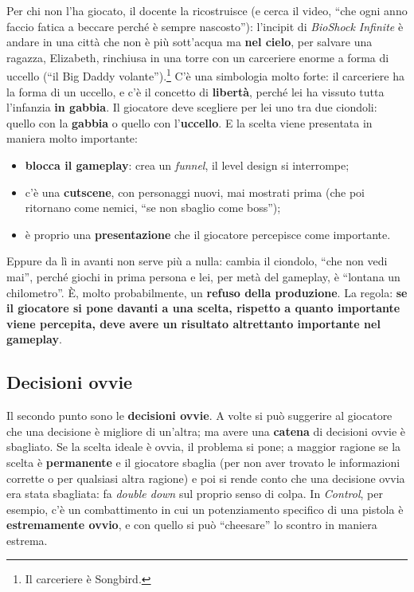 Per chi non l'ha giocato, il docente la ricostruisce (e cerca il video, ``che
ogni anno faccio fatica a beccare perché è sempre nascosto''): l'incipit di
\emph{BioShock Infinite} è andare in una città che non è più sott'acqua ma
\textbf{nel cielo}, per salvare una ragazza, Elizabeth, rinchiusa in una
torre con un carceriere enorme a forma di uccello (``il Big Daddy
volante'').\footnote{Il carceriere è Songbird.} C'è una simbologia molto
forte: il carceriere ha la forma di un uccello, e c'è il concetto di
\textbf{libertà}, perché lei ha vissuto tutta l'infanzia \textbf{in gabbia}.
Il giocatore deve scegliere per lei uno tra due ciondoli: quello con la
\textbf{gabbia} o quello con l'\textbf{uccello}. E la scelta viene presentata
in maniera molto importante:
\begin{itemize}
  \item \textbf{blocca il gameplay}: crea un \emph{funnel}, il level design
        si interrompe;
  \item c'è una \textbf{cutscene}, con personaggi nuovi, mai mostrati prima
        (che poi ritornano come nemici, ``se non sbaglio come boss'');
  \item è proprio una \textbf{presentazione} che il giocatore percepisce
        come importante.
\end{itemize}
Eppure da lì in avanti non serve più a nulla: cambia il ciondolo, ``che non
vedi mai'', perché giochi in prima persona e lei, per metà del gameplay, è
``lontana un chilometro''. È, molto probabilmente, un \textbf{refuso della
produzione}. La regola: \textbf{se il giocatore si pone davanti a una
scelta, rispetto a quanto importante viene percepita, deve avere un
risultato altrettanto importante nel gameplay}.

\subsection{Decisioni ovvie}

Il secondo punto sono le \textbf{decisioni ovvie}. A volte si può
suggerire al giocatore che una decisione è migliore di un'altra; ma avere
una \textbf{catena} di decisioni ovvie è sbagliato. Se la scelta ideale è
ovvia, il problema si pone; a maggior ragione se la scelta è
\textbf{permanente} e il giocatore sbaglia (per non aver trovato le
informazioni corrette o per qualsiasi altra ragione) e poi si rende conto che
una decisione ovvia era stata sbagliata: fa \emph{double down} sul proprio
senso di colpa. In \emph{Control}, per esempio, c'è un combattimento in cui un
potenziamento specifico di una pistola è \textbf{estremamente ovvio}, e con
quello si può ``cheesare'' lo scontro in maniera estrema.

